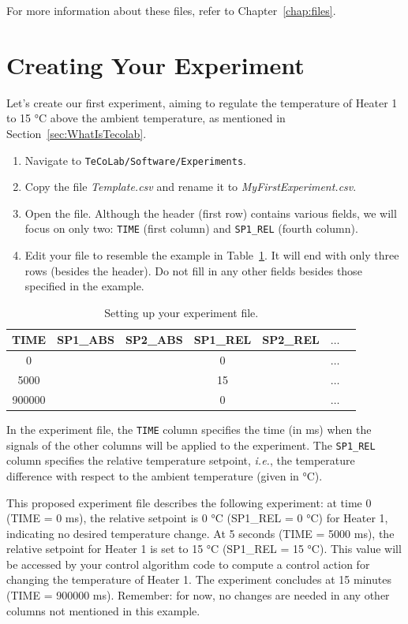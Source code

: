 \documentclass[12pt]{report}
\begin{document}
For more information about these files, refer to Chapter~\ref{chap:files}.


\section{Creating Your Experiment}

Let's create our first experiment, aiming to regulate the temperature of Heater 1 to 15 °C above the ambient temperature, as mentioned in Section~\ref{sec:WhatIsTecolab}.

\begin{enumerate}
    \item Navigate to \texttt{TeCoLab/Software/Experiments}.
    \item Copy the file \emph{Template.csv} and rename it to \emph{MyFirstExperiment.csv}.
    \item Open the file. Although the header (first row) contains various fields, we will focus on only two: \texttt{TIME} (first column) and \texttt{SP1\_REL} (fourth column).
    \item Edit your file to resemble the example in Table~\ref{tab:ExpFileExample}. It will end with only three rows (besides the header). Do not fill in any other fields besides those specified in the example.
\end{enumerate}

\begin{table}[!htbp]
    \centering
    \begin{tabular}{|c|c|c|c|c|c|c|}
    \hline
    TIME & SP1\_ABS & SP2\_ABS & SP1\_REL & SP2\_REL & $\ldots$  \\ \hline
    0 & & & 0 & & $\ldots$ \\ \hline
    5000 & & & 15 & & $\ldots$ \\ \hline
    900000 & & & 0 & & $\ldots$ \\ \hline
    \end{tabular}
    \caption{Setting up your experiment file.}\label{tab:ExpFileExample}
\end{table}

In the experiment file, the \texttt{TIME} column specifies the time (in ms) when the signals of the other columns will be applied to the experiment. The \texttt{SP1\_REL} column specifies the relative temperature setpoint, \emph{i.e.}, the temperature difference with respect to the ambient temperature (given in °C).

This proposed experiment file describes the following experiment: at time 0 (TIME = 0 ms), the relative setpoint is 0 °C (SP1\_REL = 0 °C) for Heater 1, indicating no desired temperature change. At 5 seconds (TIME = 5000 ms), the relative setpoint for Heater 1 is set to 15 °C (SP1\_REL = 15 °C). This value will be accessed by your control algorithm code to compute a control action for changing the temperature of Heater 1. The experiment concludes at 15 minutes (TIME = 900000 ms). Remember: for now, no changes are needed in any other columns not mentioned in this example.
\end{document}
